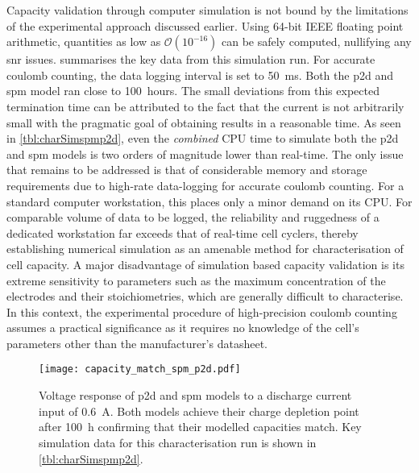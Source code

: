 Capacity validation through computer simulation  is not bound by the limitations
of the experimental approach discussed earlier. Using 64-bit IEEE floating point
arithmetic,  quantities  as  low  as  ${\mathcal{O}(10^{-16})}$  can  be  safely
computed, nullifying  any \gls{snr} issues.   summarises
the key data  from this simulation run. For accurate  coulomb counting, the data
logging  interval  is set  to  \SI{50}{\milli\second}.  Both the  \gls{p2d}  and
\gls{spm} model ran close to 100~hours.  The small deviations from this expected
termination  time  can  be attributed  to  the  fact  that  the current  is  not
arbitrarily small with  the pragmatic goal of obtaining results  in a reasonable
time. As seen in \cref{tbl:charSimspmp2d},  even the \emph{combined} CPU time to
simulate both  the \gls{p2d}  and \gls{spm}  models is  two orders  of magnitude
lower than  real-time. The only  issue that remains to  be addressed is  that of
considerable memory and  storage requirements due to  high-rate data-logging for
accurate coulomb counting. For a standard computer workstation, this places only
a minor  demand on  its CPU.  For comparable volume  of data  to be  logged, the
reliability  and ruggedness  of  a  dedicated workstation  far  exceeds that  of
real-time cell cyclers, thereby establishing numerical simulation as an amenable
method for characterisation of cell capacity. A major disadvantage of simulation
based capacity validation  is its extreme sensitivity to parameters  such as the
maximum concentration  of the  electrodes and  their stoichiometries,  which are
generally difficult to characterise. In this context, the experimental procedure
of  high-precision  coulomb counting  assumes  a  practical significance  as  it
requires no  knowledge of  the cell's parameters  other than  the manufacturer's
datasheet.

\begin{figure}[!htbp]
    \centering
    \texttt{[image: capacity\_match\_spm\_p2d.pdf]}
    \caption[Voltage response of  and  models
    for capacity validation]{Voltage response of \gls{p2d} and \gls{spm} models
        to a discharge current input of \SI{0.6}{A}. Both models achieve their
        charge depletion point after \approx\SI{100}{\hour} confirming that
        their modelled capacities match. Key simulation data for this
    characterisation run is shown in \cref{tbl:charSimspmp2d}.}
    \label{fig:capcharspmp2d}
\end{figure}

